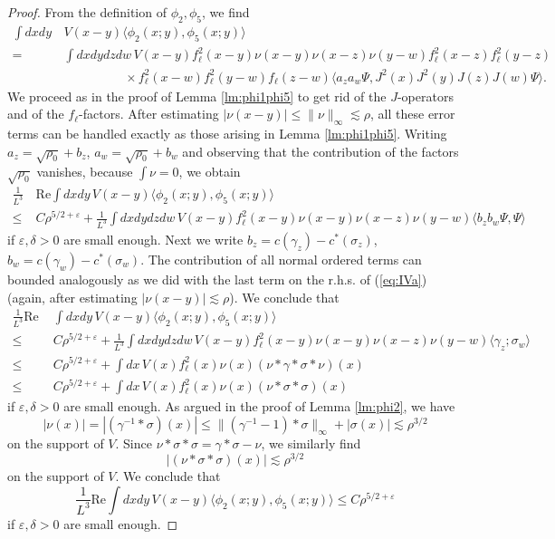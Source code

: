 \documentclass[a4paper,11pt]{article}
\def\eps{\varepsilon}
\numberwithin{equation}{section}
\begin{document}
\begin{proof} 
From the definition of $\phi_2, \phi_5$, we find 
\[ \begin{split} 
 \int dx dy \, &V(x-y) \langle \phi_2 (x;y) , \phi_5 (x;y) \rangle \\ = \; & \int dx dy dz dw \, V(x-y) f_\ell^2 (x-y) \nu (x-y) \nu (x-z) \nu (y-w) f_\ell^2 (x-z) f_\ell^2 (y-z) 
 \\  &\hspace{2cm} \times f_\ell^2 (x-w) f_\ell^2 (y-w) f_\ell(z-w) \langle a_z a_w \Psi, J^2 (x) J^2 (y) J(z) J(w) \Psi \rangle. \end{split} \]
We proceed as in the proof of Lemma \ref{lm:phi1phi5} to get rid of the $J$-operators and of the $f_\ell$-factors. After estimating $|\nu (x-y)| \leq \| \nu \|_\infty \lesssim \rho$, all these error terms can be handled exactly as those arising in Lemma \ref{lm:phi1phi5}. Writing $a_z = \sqrt{\rho_0} + b_z$, $a_w = \sqrt{\rho_0} + b_w$ and observing that the contribution of the factors $\sqrt{\rho_0}$ vanishes, because $\int \nu = 0$, we obtain 
\[ \begin{split}  \frac{1}{L^3} &\text{Re} \int dx dy \, V(x-y) \langle \phi_2 (x;y) , \phi_5 (x;y) \rangle \\  \leq\;& C \rho^{5/2+\eps} + \frac{1}{L^3} \int dx dy dz dw \, V(x-y) f_\ell^2 (x-y) \nu (x-y) \nu (x-z) \nu (y-w) \langle b_z b_w \Psi , \Psi \rangle \end{split} \]
if $\eps , \delta > 0$ are small enough. Next we write $b_z = c (\gamma_z) - c^* (\sigma_z)$, $b_w = c(\gamma_w) - c^* (\sigma_w)$. The contribution of all normal ordered terms can bounded analogously as we did with the last term on the r.h.s. of (\ref{eq:IVa}) (again, after estimating $|\nu (x-y)| \lesssim \rho$). We conclude that 
\[  \begin{split}  \frac{1}{L^3} \text{Re } &\int dx dy \, V(x-y) \langle \phi_2 (x;y) , \phi_5 (x;y) \rangle \\ \leq\;& C \rho^{5/2+\eps} + \frac{1}{L^3} \int dx dy dz dw \, V(x-y) f_\ell^2 (x-y) \nu (x-y) \nu (x-z) \nu (y-w) \langle \gamma_z ; \sigma_w \rangle \\  \leq\;& C \rho^{5/2+\eps} + \int dx \, V(x) f_\ell^2 (x) \nu (x) (\nu * \gamma *\sigma *\nu) (x) \\ \leq\;& C \rho^{5/2+\eps} + \int dx \, V(x) f_\ell^2 (x) \nu (x) (\nu * \sigma * \sigma) (x) \end{split} \]
if $\eps , \delta > 0$ are small enough. As argued in the proof of Lemma \ref{lm:phi2}, we have 
\[ |\nu (x)| = |(\gamma^{-1} * \sigma ) (x) | \leq \| (\gamma^{-1} - 1)*\sigma \|_\infty + |\sigma (x)| \lesssim \rho^{3/2} \] 
on the support of $V$. Since $\nu * \sigma * \sigma = \gamma * \sigma - \nu$, we similarly find 
\[ | (\nu * \sigma * \sigma) (x)| \lesssim \rho^{3/2} \]
on the support of $V$. We conclude that 
\[ \frac{1}{L^3} \text{Re} \int dx dy \, V(x-y) \langle \phi_2 (x;y) , \phi_5 (x;y) \rangle \leq C \rho^{5/2+\eps} \]
if $\eps , \delta > 0$ are small enough. 
\end{proof} 
\end{document}
